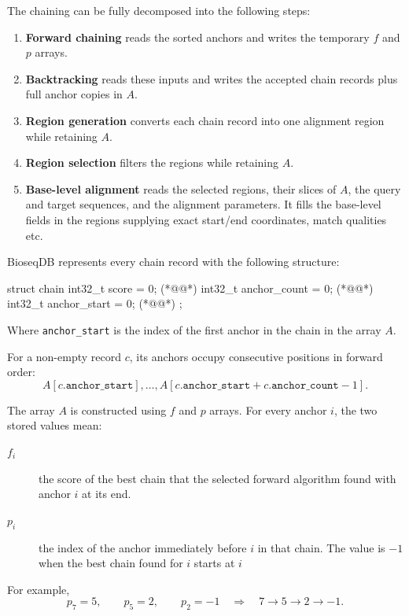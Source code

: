 The chaining can be fully decomposed into the following steps:
\begin{enumerate}
  \item \textbf{Forward chaining} reads the sorted anchors and writes the
    temporary \(f\) and \(p\) arrays.
  \item \textbf{Backtracking} reads these inputs and writes the accepted chain
    records plus full anchor copies in \(A\).
  \item \textbf{Region generation} converts each chain record into one
    alignment region while retaining \(A\).
  \item \textbf{Region selection} filters the regions while
    retaining \(A\).
  \item \textbf{Base-level alignment} reads the selected regions, their slices
    of \(A\), the query and target sequences, and the alignment parameters. It
    fills the base-level fields in the regions supplying exact start/end coordinates, match qualities etc.
\label{list:chaining-components}
\end{enumerate}

BioseqDB represents every chain record with the following structure:
\begin{BioseqCppSnippet}
  struct chain {
    int32_t score        = 0;    (*@@*)
    int32_t anchor_count = 0;    (*@@*)
    int32_t anchor_start = 0;    (*@@*)
  };
\end{BioseqCppSnippet}
Where \texttt{anchor\_start} is the index of the first anchor in the chain in the array \(A\).

For a non-empty
record \(c\), its anchors occupy consecutive positions in forward order:
\[
  A[c.\texttt{anchor\_start}],\ldots,
  A[c.\texttt{anchor\_start}+c.\texttt{anchor\_count}-1].
\]

The array \(A\) is constructed using $f$ and $p$ arrays. For every anchor \(i\), the two stored values mean:
\begin{description}
  \item[\(f_i\)] the score of the best chain that the selected forward
    algorithm found with anchor \(i\) at its end.
  \item[\(p_i\)] the index of the anchor immediately before \(i\) in that
    chain. The value is \(-1\) when the best chain found for \(i\) starts at
    \(i\)
\end{description}
For example,
\[
  p_7=5,\qquad p_5=2,\qquad p_2=-1
  \quad\Longrightarrow\quad
  7\to5\to2\to-1.
\]

